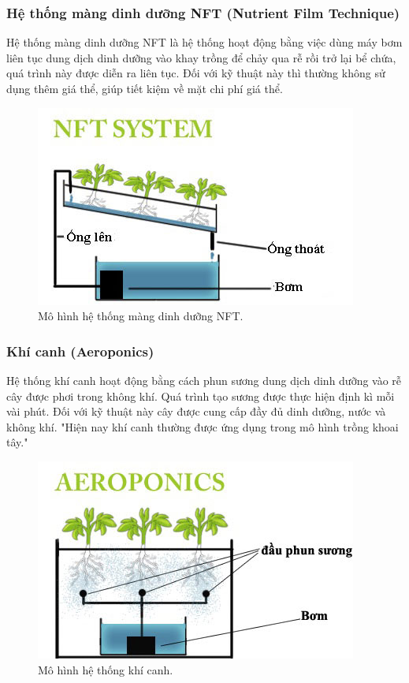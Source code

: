 \documentclass[a4paper,12pt,oneside]{article}
\begin{document}
\subsubsection{Hệ thống màng dinh dưỡng NFT (Nutrient Film Technique)}
\noindent Hệ thống màng dinh dưỡng NFT là hệ thống hoạt động bằng việc dùng máy bơm liên tục dung dịch dinh dưỡng vào khay trồng để chảy qua rễ rồi trở lại bể chứa, quá trình này được diễn ra liên tục. Đối với kỹ thuật này thì thường không sử dụng thêm giá thể, giúp tiết kiệm về mặt chi phí giá thể.


\begin{figure}[H]
	\centering
	\includegraphics[scale=.8]{hinh/NFT_system.jpg}
	\caption{Mô hình hệ thống màng dinh dưỡng NFT\cite{thuycanh}.}
	\label{fig:NFT_system}
\end{figure}


\subsubsection{Khí canh (Aeroponics)}

\noindent Hệ thống khí canh hoạt động bằng cách phun sương dung dịch dinh dưỡng vào rễ cây được phơi trong không khí. Quá trình tạo sương được thực hiện định kì mỗi vài phút. Đối với kỹ thuật này cây được cung cấp đầy đủ dinh dưỡng, nước và không khí. "Hiện nay khí canh thường được ứng dụng trong mô hình trồng khoai tây."\cite{thuycanh}


\begin{figure}[H]
	\centering
	\includegraphics[scale=.9]{hinh/aeroponics.jpg}
	\caption{Mô hình hệ thống khí canh\cite{thuycanh}.}
	\label{fig:aeroponics}
\end{figure}
\end{document}
